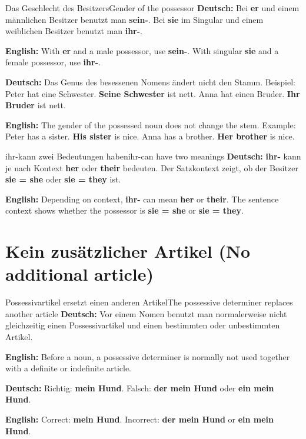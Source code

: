\documentclass[a4paper,11pt]{article}
\newcommand{\GermanText}[1]{\textbf{Deutsch: }#1\par}
\newcommand{\EnglishText}[1]{{\small\color{SoftGray}\textbf{English: }#1\par}}
\begin{document}
\begin{grammarentry}{Das Geschlecht des Besitzers}{Gender of the possessor}
\GermanText{Bei \textbf{er} und einem männlichen Besitzer benutzt man \textbf{sein-}. Bei \textbf{sie} im Singular und einem weiblichen Besitzer benutzt man \textbf{ihr-}.}
\EnglishText{With \textbf{er} and a male possessor, use \textbf{sein-}. With singular \textbf{sie} and a female possessor, use \textbf{ihr-}.}

\GermanText{Das Genus des besessenen Nomens ändert nicht den Stamm. Beispiel: Peter hat eine Schwester. \textbf{Seine Schwester} ist nett. Anna hat einen Bruder. \textbf{Ihr Bruder} ist nett.}
\EnglishText{The gender of the possessed noun does not change the stem. Example: Peter has a sister. \textbf{His sister} is nice. Anna has a brother. \textbf{Her brother} is nice.}
\end{grammarentry}

\begin{grammarentry}{\glqq ihr-\grqq kann zwei Bedeutungen haben}{\glqq ihr-\grqq can have two meanings}
\GermanText{\textbf{ihr-} kann je nach Kontext \textbf{her} oder \textbf{their} bedeuten. Der Satzkontext zeigt, ob der Besitzer \textbf{sie = she} oder \textbf{sie = they} ist.}
\EnglishText{Depending on context, \textbf{ihr-} can mean \textbf{her} or \textbf{their}. The sentence context shows whether the possessor is \textbf{sie = she} or \textbf{sie = they}.}
\end{grammarentry}

\section{Kein zusätzlicher Artikel \textnormal{(No additional article)}}

\begin{grammarentry}{Possessivartikel ersetzt einen anderen Artikel}{The possessive determiner replaces another article}
\GermanText{Vor einem Nomen benutzt man normalerweise nicht gleichzeitig einen Possessivartikel und einen bestimmten oder unbestimmten Artikel.}
\EnglishText{Before a noun, a possessive determiner is normally not used together with a definite or indefinite article.}

\GermanText{Richtig: \textbf{mein Hund}. Falsch: \textbf{der mein Hund} oder \textbf{ein mein Hund}.}
\EnglishText{Correct: \textbf{mein Hund}. Incorrect: \textbf{der mein Hund} or \textbf{ein mein Hund}.}
\end{grammarentry}
\end{document}
